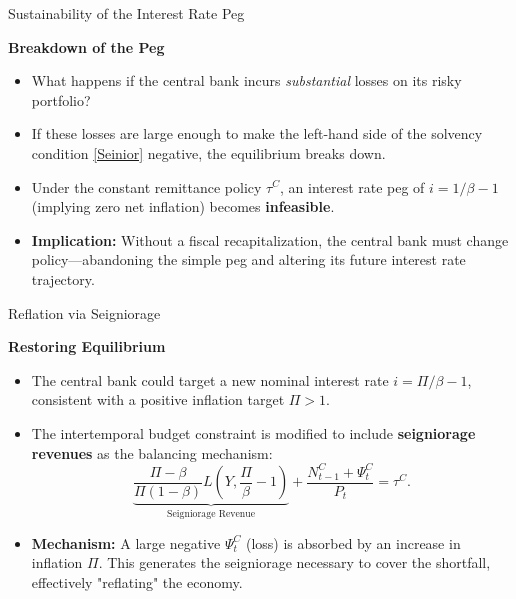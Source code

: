 \documentclass[11pt,aspectratio=169]{beamer}
\begin{document}
\begin{frame}{Sustainability of the Interest Rate Peg}
\small

\textbf{Breakdown of the Peg}
\begin{itemize}
    \item What happens if the central bank incurs \textit{substantial} losses on its risky portfolio?
    \vspace{0.25em}
    \item If these losses are large enough to make the left-hand side of the solvency condition \eqref{Seinior} negative, the equilibrium breaks down.
     \vspace{0.25em}
    \item Under the constant remittance policy $\tau^C$, an interest rate peg of $i = 1/\beta - 1$ (implying zero net inflation) becomes \textbf{infeasible}.
     \vspace{0.25em}
    \item \textbf{Implication:} Without a fiscal recapitalization, the central bank must change policy—abandoning the simple peg and altering its future interest rate trajectory.
\end{itemize}
\end{frame}


\begin{frame}{Reflation via Seigniorage}
\small

\textbf{Restoring Equilibrium}
\begin{itemize}
    \item The central bank could target a new nominal interest rate $i = \Pi/\beta - 1$, consistent with a positive inflation target $\Pi > 1$.
    \item The intertemporal budget constraint is modified to include \textbf{seigniorage revenues} as the balancing mechanism:
    \begin{equation*}
        \underbrace{\frac{\Pi -\beta }{\Pi (1-\beta )}L\left( Y,\frac{\Pi }{\beta }-1\right)}_{\text{Seigniorage Revenue}} + \frac{N_{t-1}^{C}+\Psi _{t}^{C}}{P_{t}}=\tau ^{C}.
    \end{equation*}
    \item \textbf{Mechanism:} A large negative $\Psi_t^C$ (loss) is absorbed by an increase in inflation $\Pi$. This generates the seigniorage necessary to cover the shortfall, effectively "reflating" the economy.
\end{itemize}
\end{frame}
\end{document}

